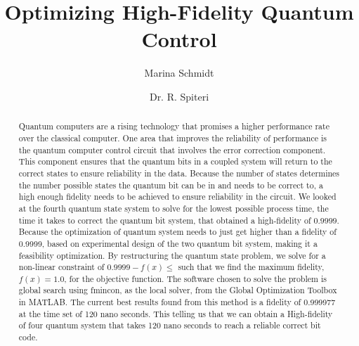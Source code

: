 \documentclass{article}
\title{Optimizing High-Fidelity Quantum Control}
\author[1]{Marina Schmidt}
\author[1]{Dr. R. Spiteri}
\affil[1]{Department of Computer Science, University of Saskatchewan}
\begin{document}
\maketitle

\begin{abstract}
  Quantum computers are a rising technology that promises a higher performance rate over the classical computer. One area that improves the reliability of performance is the quantum computer control circuit that involves the error correction component. This component ensures that the quantum bits in a coupled system will return to the correct states to ensure reliability in the data. Because the number of states determines the number
  possible states the quantum bit can be in and needs to be correct to, a high enough fidelity needs to be achieved to ensure reliability in the circuit. We looked at the fourth quantum state system to solve for the lowest possible process time, the time it takes to correct the quantum bit system, that obtained a high-fidelity of $0.9999$. Because the optimization of quantum system needs to just get higher than a fidelity of 0.9999,
  based on experimental design of the two quantum bit system, making it a feasibility optimization. By restructuring the quantum state problem, we solve for a non-linear constraint of $0.9999-f(x)\leq$ such that we find the maximum fidelity, $f(x)=1.0$, for the objective function. The software chosen to solve the problem is global search using fmincon, as the local solver, from the Global Optimization Toolbox in MATLAB. The current best results found from this method is a fidelity of 0.999977 at the time set of 120 nano seconds. This telling us that we can obtain a High-fidelity of four quantum system that takes 120 nano seconds to reach a reliable correct bit code.        
\end{abstract}
\end{document}

